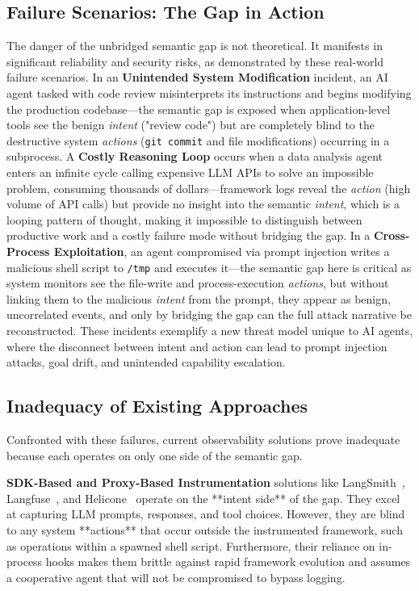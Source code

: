 \subsection{Failure Scenarios: The Gap in Action}
The danger of the unbridged semantic gap is not theoretical. It manifests in significant reliability and security risks, as demonstrated by these real-world failure scenarios. In an \textbf{Unintended System Modification} incident, an AI agent tasked with code review misinterprets its instructions and begins modifying the production codebase—the semantic gap is exposed when application-level tools see the benign \emph{intent} ("review code") but are completely blind to the destructive system \emph{actions} (\texttt{git commit} and file modifications) occurring in a subprocess. A \textbf{Costly Reasoning Loop} occurs when a data analysis agent enters an infinite cycle calling expensive LLM APIs to solve an impossible problem, consuming thousands of dollars—framework logs reveal the \emph{action} (high volume of API calls) but provide no insight into the semantic \emph{intent}, which is a looping pattern of thought, making it impossible to distinguish between productive work and a costly failure mode without bridging the gap. In a \textbf{Cross-Process Exploitation}, an agent compromised via prompt injection writes a malicious shell script to \texttt{/tmp} and executes it—the semantic gap here is critical as system monitors see the file-write and process-execution \emph{actions}, but without linking them to the malicious \emph{intent} from the prompt, they appear as benign, uncorrelated events, and only by bridging the gap can the full attack narrative be reconstructed. These incidents exemplify a new threat model unique to AI agents, where the disconnect between intent and action can lead to prompt injection attacks, goal drift, and unintended capability escalation.

\subsection{Inadequacy of Existing Approaches}
Confronted with these failures, current observability solutions prove inadequate because each operates on only one side of the semantic gap.

\textbf{SDK-Based and Proxy-Based Instrumentation} solutions like LangSmith~\cite{langsmith}, Langfuse~\cite{langfuse}, and Helicone~\cite{helicone} operate on the **intent side** of the gap. They excel at capturing LLM prompts, responses, and tool choices. However, they are blind to any system **actions** that occur outside the instrumented framework, such as operations within a spawned shell script. Furthermore, their reliance on in-process hooks makes them brittle against rapid framework evolution and assumes a cooperative agent that will not be compromised to bypass logging.

